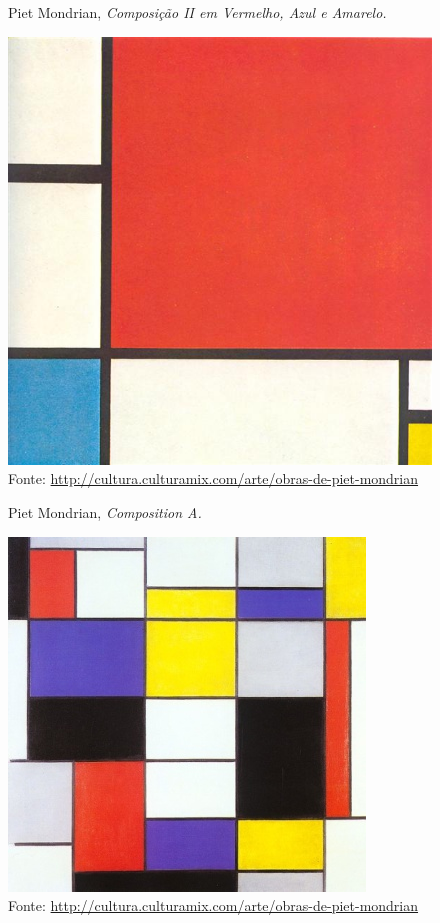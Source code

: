 \begin{refsection}
    \begin{figure}[ht]%
        \centering%
        \caption{Piet Mondrian, \textit{Composição II em Vermelho, Azul e Amarelo.}}%
        \includegraphics[width=.5\textwidth]{articles/04-matematica-na-arte--/figura2.jpeg}%
        \caption*{Fonte: \url{http://cultura.culturamix.com/arte/obras-de-piet-mondrian}}%
        \label{fig:composicaoII}%
    \end{figure}%
    
    \begin{figure}[ht]%
        \centering%
        \caption{Piet Mondrian, \textit{Composition A.}}%
        \includegraphics[width=.5\textwidth]{articles/04-matematica-na-arte--/figura3.jpeg}%
        \caption*{Fonte: \url{http://cultura.culturamix.com/arte/obras-de-piet-mondrian}}%
        \label{fig:composition-a}%
    \end{figure}%



\end{refsection}
